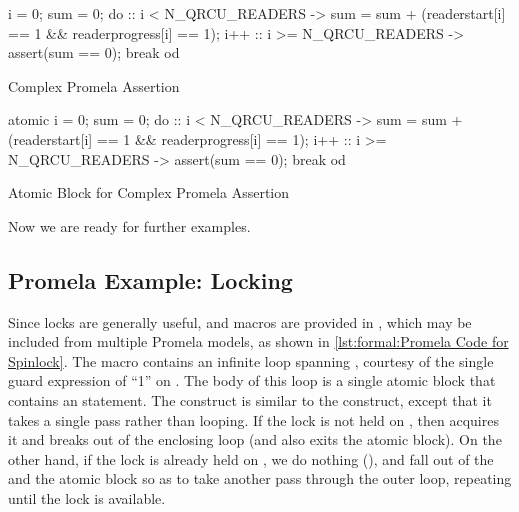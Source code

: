 \begin{listing}
\begin{VerbatimL}
i = 0;
sum = 0;
do
:: i < N_QRCU_READERS ->
	sum = sum + (readerstart[i] == 1 &&
	             readerprogress[i] == 1);
	i++
:: i >= N_QRCU_READERS ->
	assert(sum == 0);
	break
od
\end{VerbatimL}
\caption{Complex Promela Assertion}
\label{lst:formal:Complex Promela Assertion}
\end{listing}

\begin{listing}
\begin{VerbatimL}
atomic {
	i = 0;
	sum = 0;
	do
	:: i < N_QRCU_READERS ->
		sum = sum + (readerstart[i] == 1 &&
		             readerprogress[i] == 1);
		i++
	:: i >= N_QRCU_READERS ->
		assert(sum == 0);
		break
	od
}
\end{VerbatimL}
\caption{Atomic Block for Complex Promela Assertion}
\label{lst:formal:Atomic Block for Complex Promela Assertion}
\end{listing}

Now we are ready for further examples.

\subsection{Promela Example:
			     Locking}
\label{sec:formal:Promela Example: Locking}

\begin{fcvref}
Since locks are generally useful,  and
macros are provided in , which may be included from
multiple Promela models, as shown in
\cref{lst:formal:Promela Code for Spinlock}.
The  macro contains an infinite  loop
spanning ,
courtesy of the single guard expression of ``1'' on .
The body of this loop is a single atomic block that contains
an  statement.
The  construct is similar to the  construct, except
that it takes a single pass rather than looping.
If the lock is not held on , then
 acquires it and
 breaks out of the enclosing  loop (and also exits
the atomic block).
On the other hand, if the lock is already held on ,
we do nothing (), and fall out of the  and the
atomic block so as to take another pass through the outer
loop, repeating until the lock is available.
\end{fcvref}

